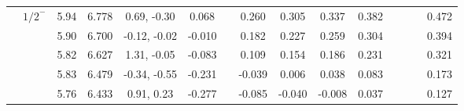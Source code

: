 \documentclass[prd,twocolumn,floatfix,nofootinbib]{revtex4}
\begin{document}
\begin{table*}[!htbp]
\begin{tabular}{cc|ccc|cccccccccc}
            &${1/2}^{-}$    &5.94   &6.778  &0.69, -0.30 &0.068 & &0.260 &0.305 &0.337 &0.382 & & & &0.472 \\
            &               &5.90   &6.700  &-0.12, -0.02 &-0.010 & &0.182 &0.227 &0.259 &0.304 & & & &0.394 \\
            &               &5.82   &6.627  &1.31, -0.05 &-0.083 & &0.109 &0.154 &0.186 &0.231 & & & &0.321 \\
            &               &5.83   &6.479  &-0.34, -0.55 &-0.231 & &-0.039 &0.006 &0.038 &0.083 & & & &0.173 \\
            &               &5.76   &6.433  &0.91, 0.23 &-0.277 & &-0.085 &-0.040 &-0.008 &0.037 & & & &0.127 \\   
        \bottomrule[0.5pt]\bottomrule[1.5pt]
    \end{tabular}
\end{table*}
\end{document}
